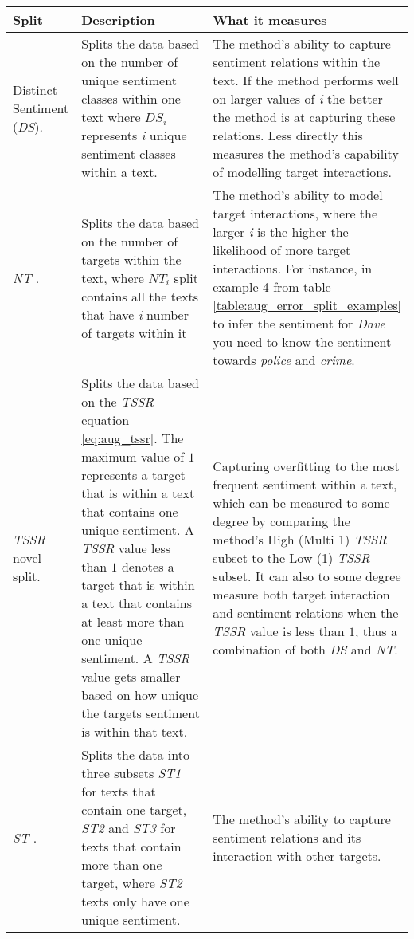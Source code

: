 \begin{longtable}{|p{0.15\linewidth}|p{0.45\linewidth}|p{0.4\linewidth}|}
\hline
Split & Description & What it measures \\
\hline
Distinct Sentiment (\textit{DS})\citep{wang-etal-2017-tdparse}. & Splits the data based on the number of unique sentiment classes within one text where $DS_i$ represents \textit{i} unique sentiment classes within a text. &  The method's ability to capture sentiment relations within the text. If the method performs well on larger values of \textit{i} the better the method is at capturing these relations. Less directly this measures the method's capability of modelling target interactions. \\
\hline
\textit{NT} \citep{zhang-etal-2019-aspect}. & Splits the data based on the number of targets within the text, where $NT_i$ split contains all the texts that have \textit{i} number of targets within it & The method's ability to model target interactions, where the larger \textit{i} is the higher the likelihood of more target interactions. For instance, in example 4 from table \ref{table:aug_error_split_examples} to infer the sentiment for \textit{Dave} you need to know the sentiment towards \textit{police} and \textit{crime}.\\
\hline
\textit{TSSR} novel split. & Splits the data based on the \textit{TSSR} equation \ref{eq:aug_tssr}. The maximum value of $1$ represents a target that is within a text that contains one unique sentiment. A \textit{TSSR} value less than $1$ denotes a target that is within a text that contains at least more than one unique sentiment. A \textit{TSSR} value gets smaller based on how unique the targets sentiment is within that text. & Capturing overfitting to the most frequent sentiment within a text, which can be measured to some degree by comparing the method's High (Multi 1) \textit{TSSR} subset to the Low (1) \textit{TSSR} subset. It can also to some degree measure both target interaction and sentiment relations when the \textit{TSSR} value is less than $1$, thus a combination of both \textit{DS} and \textit{NT}.\\
\hline
\textit{ST} \citep{nguyen-shirai-2015-phrasernn}. & Splits the data into three subsets \textit{ST1} for texts that contain one target, \textit{ST2} and \textit{ST3} for texts that contain more than one target, where \textit{ST2} texts only have one unique sentiment. & The method's ability to capture sentiment relations and its interaction with other targets. \\

\end{longtable}

